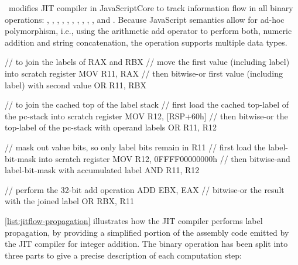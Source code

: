 \FlowCore\ modifies JIT compiler in JavaScriptCore to track information flow in all binary operations:  , , , , , , , , , , and .
Because JavaScript semantics allow for ad-hoc polymorphism, i.e., using the arithmetic add operator to perform both, numeric addition and string concatenation, the  operation supports multiple data types.

\begin{asmcode}
// to join the labels of RAX and RBX
// move the first value (including label) into scratch register
MOV R11, RAX
// then bitwise-or first value (including label) with second value
OR  R11, RBX

// to join the cached top of the label stack
// first load the cached top-label of the pc-stack into scratch register
MOV R12, [RSP+60h]
// then bitwise-or the top-label of the pc-stack with operand labels
OR  R11, R12

// mask out value bits, so only label bits remain in R11
// first load the label-bit-mask into scratch register
MOV R12, 0FFFF00000000h
// then bitwise-and label-bit-mask with accumulated label
AND R11, R12

// perform the 32-bit add operation
ADD EBX, EAX
// bitwise-or the result with the joined label
OR  RBX, R11
\end{asmcode}

\autoref{list:jitflow-propagation} illustrates how the JIT compiler performs label propagation, by providing a simplified portion of the assembly code emitted by the JIT compiler for integer addition.
The binary operation has been split into three parts to give a precise description of each computation step:


